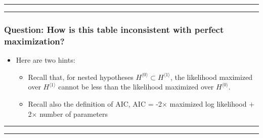\documentclass[]{article}
\begin{document}
\begin{center}\rule{0.5\linewidth}{\linethickness}\end{center}

\begin{center}\rule{0.5\linewidth}{\linethickness}\end{center}

\subsubsection{Question: How is this table inconsistent with perfect
maximization?}\label{question-how-is-this-table-inconsistent-with-perfect-maximization}

\begin{itemize}
\item
  Here are two hints:

  \begin{itemize}
  \item
    Recall that, for nested hypotheses
    \(H^{\langle 0\rangle}\subset H^{\langle 1\rangle}\), the likelihood
    maximized over \(H^{\langle 1\rangle}\) cannot be less than the
    likelihood maximized over \(H^{\langle 0\rangle}\).
  \item
    Recall also the definition of AIC, AIC = -2\(\times\) maximized log
    likelihood \(+\) 2\(\times\) number of parameters
  \end{itemize}
\end{itemize}

\begin{center}\rule{0.5\linewidth}{\linethickness}\end{center}

\begin{center}\rule{0.5\linewidth}{\linethickness}\end{center}
\end{document}
